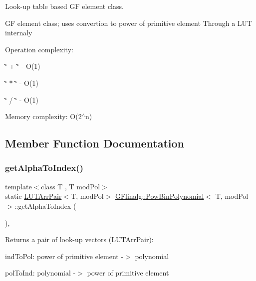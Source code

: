 Look-\/up table based GF element class. 

GF element class; uses convertion to power of primitive element Through a L\+UT internaly

Operation complexity\+:
\begin{DoxyItemize}
\item \char`\"{} + \char`\"{} -\/ O(1)
\item \char`\"{} $\ast$ \char`\"{} -\/ O(1)
\item \char`\"{} / \char`\"{} -\/ O(1)
\end{DoxyItemize}

Memory complexity\+: O(2$^\wedge$n) 

\subsection{Member Function Documentation}
\mbox{\label{class_g_flinalg_1_1_pow_bin_polynomial_a6ecd074ac3fe062ce972ebffeb8046a6}} 
\subsubsection{\texorpdfstring{getAlphaToIndex()}{getAlphaToIndex()}}
{\footnotesize\ttfamily template$<$class T , T mod\+Pol$>$ \\
static \mbox{\hyperlink{struct_g_flinalg_1_1op_1_1_l_u_t_arr_pair}{L\+U\+T\+Arr\+Pair}}$<$T, mod\+Pol$>$ \mbox{\hyperlink{class_g_flinalg_1_1_pow_bin_polynomial}{G\+Flinalg\+::\+Pow\+Bin\+Polynomial}}$<$ T, mod\+Pol $>$\+::get\+Alpha\+To\+Index (\begin{DoxyParamCaption}{ }\end{DoxyParamCaption})\hspace{0.3cm}{\ttfamily [inline]}, {\ttfamily [static]}}

Returns a pair of look-\/up vectors (L\+U\+T\+Arr\+Pair)\+:
\begin{DoxyItemize}
\item ind\+To\+Pol\+: power of primitive element -\/$>$ polynomial
\item pol\+To\+Ind\+: polynomial -\/$>$ power of primitive element 
\end{DoxyItemize}\mbox{\label{class_g_flinalg_1_1_pow_bin_polynomial_ad0b7663c261f93051da600f72b901625}} 
